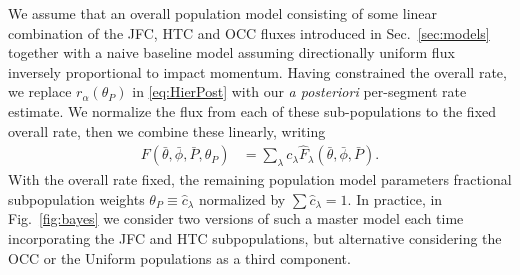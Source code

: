 \documentclass[twocolumn, trackchanges]{aastex62}
\newcommand\aastex{AAS\TeX}
\begin{document}
We assume that an overall population model consisting of some linear combination of the JFC, HTC and OCC fluxes introduced in Sec.~\ref{sec:models} together with a naive baseline model assuming directionally uniform flux inversely proportional to impact momentum. Having constrained the overall rate, we replace $r_\alpha(\theta_P)$ in \eqref{eq:HierPost} with our \emph{a posteriori} per-segment rate estimate. 
We normalize the flux from each of these sub-populations to the fixed overall rate, then we combine these linearly, writing
\begin{align}
  F(\bar\theta,\bar\phi,\bar P,\theta_P)&=\sum_{\lambda} c_\lambda \hat F_\lambda(\bar\theta,\bar\phi,\bar P).\nonumber
\end{align}
With the overall rate fixed, the remaining population model parameters fractional subpopulation weights $\theta_P\equiv{\hat c_\lambda}$ normalized by $\sum\hat c_\lambda=1$. In practice, in Fig.~\ref{fig:bayes} we consider two versions of such a master model each time incorporating the JFC and HTC subpopulations, but alternative considering the OCC or the Uniform populations as a third component. 








\listofchanges
\end{document}
